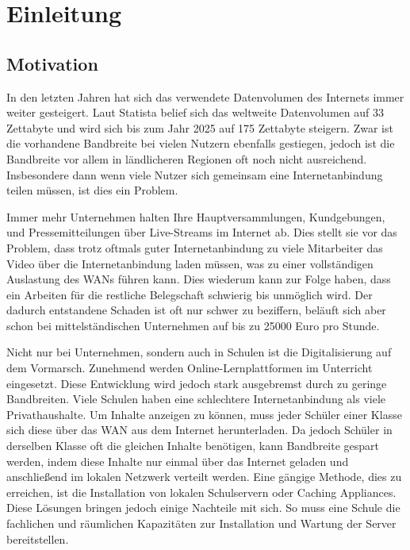 \chapter{Einleitung}\label{ch:introduction}


%

\section{Motivation}
In den letzten Jahren hat sich das verwendete Datenvolumen des Internets immer weiter gesteigert. Laut Statista belief sich das weltweite Datenvolumen auf 33 Zettabyte und wird sich bis zum Jahr 2025 auf 175 Zettabyte steigern.\cite{statistica-datenvolumen} Zwar ist die vorhandene Bandbreite bei vielen Nutzern ebenfalls gestiegen, jedoch ist die Bandbreite vor allem in ländlicheren Regionen oft noch nicht ausreichend.\cite{bmvi-bandbreite} Insbesondere dann wenn viele Nutzer sich gemeinsam eine Internetanbindung teilen müssen, ist dies ein Problem.

Immer mehr Unternehmen halten Ihre Hauptversammlungen, Kundgebungen, und Pressemitteilungen über Live-Streams im Internet ab. Dies stellt sie vor das Problem, dass trotz oftmals guter Internetanbindung zu viele Mitarbeiter das Video über die Internetanbindung laden müssen, was zu einer vollständigen Auslastung des WANs führen kann. Dies wiederum kann zur Folge haben, dass ein Arbeiten für die restliche Belegschaft schwierig bis unmöglich wird. Der dadurch entstandene Schaden ist oft nur schwer zu beziffern, beläuft sich aber schon bei mittelständischen Unternehmen auf bis zu 25000 Euro pro Stunde.\cite{zero-internet-schaden}

Nicht nur bei Unternehmen, sondern auch in Schulen ist die Digitalisierung auf dem Vormarsch. Zunehmend werden Online-Lernplattformen im Unterricht eingesetzt. Diese Entwicklung wird jedoch stark ausgebremst durch zu geringe Bandbreiten. Viele Schulen haben eine schlechtere Internetanbindung als viele Privathaushalte.\cite{sonderstudie_digital} Um Inhalte anzeigen zu können, muss jeder Schüler einer Klasse sich diese über das WAN aus dem Internet herunterladen. Da jedoch Schüler in derselben Klasse oft die gleichen Inhalte benötigen, kann Bandbreite gespart werden, indem diese Inhalte nur einmal über das Internet geladen und anschließend im lokalen Netzwerk verteilt werden. Eine gängige Methode, dies zu erreichen, ist die Installation von lokalen Schulservern oder Caching Appliances. Diese Lösungen bringen jedoch einige Nachteile mit sich. So muss eine Schule die fachlichen und räumlichen Kapazitäten zur Installation und Wartung der Server bereitstellen. 

